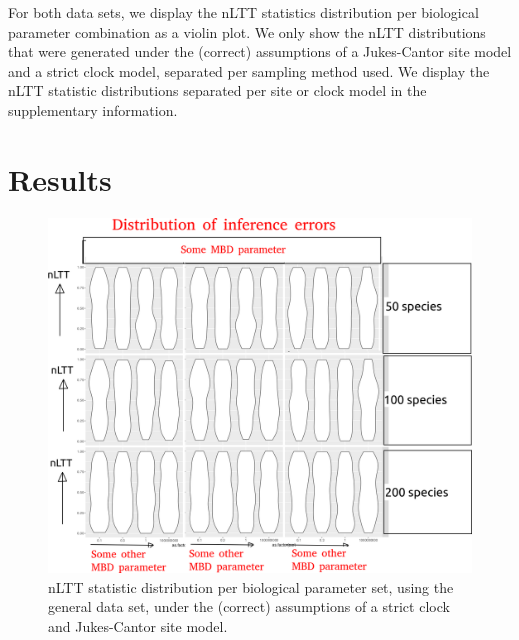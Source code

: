 \documentclass{article}
\begin{document}
For both data sets, we display the nLTT statistics distribution per
biological parameter combination as a violin plot.
We only show the nLTT distributions
that were generated under the (correct) assumptions of a Jukes-Cantor site model
and a strict clock model, separated per sampling method used. 
We display the nLTT statistic distributions separated per site or clock model 
in the supplementary information.

\section{Results}

\begin{figure}[!htbp]
  \includegraphics[width=\textwidth]{fig_general.png}
  \caption{
    nLTT statistic distribution per biological parameter set, using the
    general data set, 
    under the (correct) assumptions of a strict clock and Jukes-Cantor site model.
  }
\end{figure}

\end{document}
